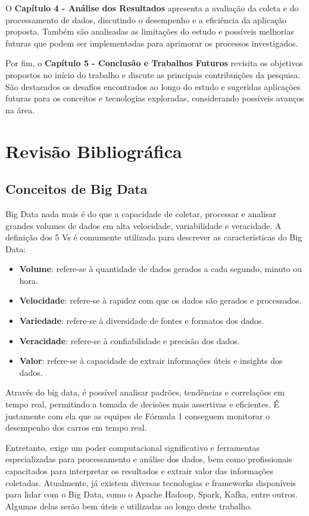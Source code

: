 \documentclass[12pt, %
openright, 
oneside, %
a4paper,    %
brazil]{facom-ufu-abntex2}
\begin{document}
O \textbf{Capítulo 4 - Análise dos Resultados} apresenta a avaliação da coleta e do processamento de dados, discutindo o desempenho e a eficiência da aplicação proposta. 
Também são analisadas as limitações do estudo e possíveis melhorias futuras que podem ser implementadas para aprimorar os processos investigados.

Por fim, o \textbf{Capítulo 5 - Conclusão e Trabalhos Futuros} revisita os objetivos propostos no início do trabalho e discute as principais contribuições da pesquisa. 
São destacados os desafios encontrados ao longo do estudo e sugeridas aplicações futuras para os conceitos e tecnologias exploradas, considerando possíveis avanços na área.


\chapter{Revisão Bibliográfica}
\section{Conceitos de Big Data}
Big Data nada mais é do que a capacidade de coletar, processar e analisar grandes volumes de dados em alta velocidade,
variabilidade e veracidade. A definição dos 5 Vs é comumente utilizada para descrever as características do Big Data:

\begin{itemize}
    \item \textbf{Volume}: refere-se à quantidade de dados gerados a cada segundo, minuto ou hora. 
    \item \textbf{Velocidade}: refere-se à rapidez com que os dados são gerados e processados.
    \item \textbf{Variedade}: refere-se à diversidade de fontes e formatos dos dados.
    \item \textbf{Veracidade}: refere-se à confiabilidade e precisão dos dados.
    \item \textbf{Valor}: refere-se à capacidade de extrair informações úteis e insights dos dados.
\end{itemize}

Através do big data, é possível analisar padrões, tendências e correlações em tempo real, permitindo a tomada de decisões mais assertivas
e eficientes. É justamente com ela que as equipes de Fórmula 1 conseguem monitorar o desempenho dos carros em tempo real.

Entretanto, exige um poder computacional significativo e ferramentas especializadas para processamento e análise dos dados,
bem como profissionais capacitados para interpretar os resultados e extrair valor das informações coletadas. Atualmente,
já existem diversas tecnologias e frameworks disponíveis para lidar com o Big Data, como o Apache Hadoop, Spark, Kafka, entre outros.
Algumas delas serão bem úteis e utilizadas ao longo deste trabalho.
\end{document}
